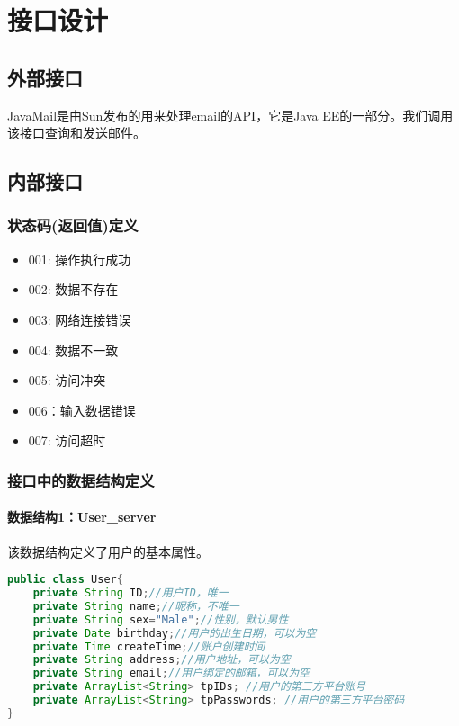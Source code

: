 \chapter{\color{red} 接口设计}
\section{外部接口}
JavaMail是由Sun发布的用来处理email的API，它是Java EE的一部分。我们调用该接口查询和发送邮件。


\section{\color{red} 内部接口}
{\color{red}
\subsection{\color{red}状态码(返回值)定义}
\begin{itemize}
    \item 001: 操作执行成功
    \item 002: 数据不存在
    \item 003: 网络连接错误
    \item 004: 数据不一致
    \item 005: 访问冲突
    \item 006：输入数据错误
    \item 007: 访问超时
\end{itemize}
}


\subsection{\color{red} 接口中的数据结构定义}
\subsubsection{\color{red} 数据结构1：User\_server}
该数据结构定义了用户的基本属性。
\begin{lstlisting}[language=Java, caption=User定义]
public class User{
    private String ID;//用户ID，唯一
    private String name;//昵称，不唯一
    private String sex="Male";//性别，默认男性
    private Date birthday;//用户的出生日期，可以为空
    private Time createTime;//账户创建时间
    private String address;//用户地址，可以为空
    private String email;//用户绑定的邮箱，可以为空
    private ArrayList<String> tpIDs; //用户的第三方平台账号
    private ArrayList<String> tpPasswords; //用户的第三方平台密码
}
\end{lstlisting}

